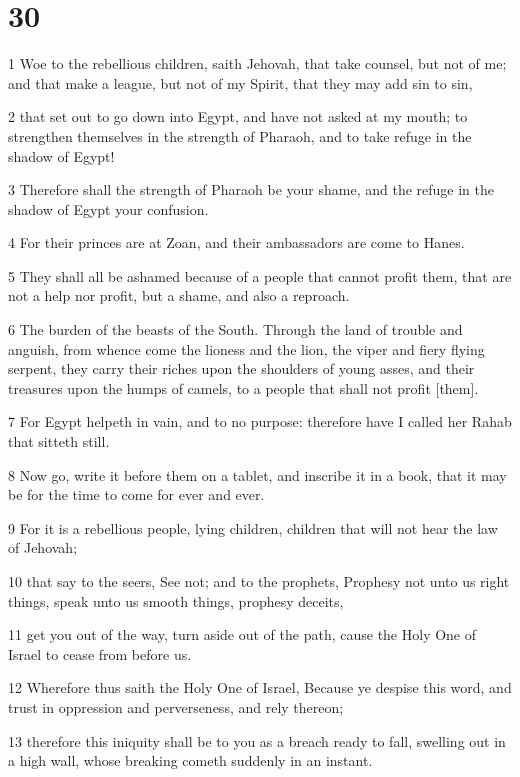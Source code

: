 \chapter{30}

\par 1 Woe to the rebellious children, saith Jehovah, that take counsel, but not of me; and that make a league, but not of my Spirit, that they may add sin to sin,
\par 2 that set out to go down into Egypt, and have not asked at my mouth; to strengthen themselves in the strength of Pharaoh, and to take refuge in the shadow of Egypt!
\par 3 Therefore shall the strength of Pharaoh be your shame, and the refuge in the shadow of Egypt your confusion.
\par 4 For their princes are at Zoan, and their ambassadors are come to Hanes.
\par 5 They shall all be ashamed because of a people that cannot profit them, that are not a help nor profit, but a shame, and also a reproach.
\par 6 The burden of the beasts of the South. Through the land of trouble and anguish, from whence come the lioness and the lion, the viper and fiery flying serpent, they carry their riches upon the shoulders of young asses, and their treasures upon the humps of camels, to a people that shall not profit [them].
\par 7 For Egypt helpeth in vain, and to no purpose: therefore have I called her Rahab that sitteth still.
\par 8 Now go, write it before them on a tablet, and inscribe it in a book, that it may be for the time to come for ever and ever.
\par 9 For it is a rebellious people, lying children, children that will not hear the law of Jehovah;
\par 10 that say to the seers, See not; and to the prophets, Prophesy not unto us right things, speak unto us smooth things, prophesy deceits,
\par 11 get you out of the way, turn aside out of the path, cause the Holy One of Israel to cease from before us.
\par 12 Wherefore thus saith the Holy One of Israel, Because ye despise this word, and trust in oppression and perverseness, and rely thereon;
\par 13 therefore this iniquity shall be to you as a breach ready to fall, swelling out in a high wall, whose breaking cometh suddenly in an instant.
